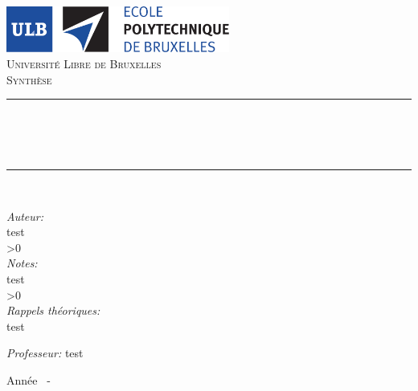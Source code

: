 \AddToShipoutPicture*{\BackgroundPic}

\begin{titlepage}
	\begin{center}	
			
		\newcommand{\HRule}{\rule{\linewidth}{0.5mm}}   			            %
		\includegraphics[width=0.55\textwidth]{../../Builder/titlepage/logo.pdf}~\\[1cm]				%
			
			\textsc{\LARGE Université Libre de Bruxelles}\\[1.5cm]
			\textsc{\Large Synthèse}\\[0.5cm]
			
			\HRule \\[0.4cm]
			{ \huge \bfseries \cours \ \\\memo \\[0.4cm] }
			
			
			\HRule \\[1.5cm]
			\begin{minipage}[t]{0.6\textwidth}
				\begin{flushleft}%
					\emph{Auteur:}\\
					\whileboolexpr
					{ test {\ifnumcomp{\value{iter}}{<}{\theauteurcnt}} }%
					{\getauteur{\theiter}\\}
					\setcounter{iter}{0}%
					\ifnum\thenoteurcnt>0%
					\ \\
					\emph{Notes:}\\
					\whileboolexpr
					{ test {\ifnumcomp{\value{iter}}{<}{\thenoteurcnt}} }%
					{\getnoteur{\theiter}\\}%
					\setcounter{iter}{0}%
					\fi%
					\ifnum\therappeltheocnt>0%
					\ \\
					\emph{Rappels théoriques:}\\
					\whileboolexpr
					{ test {\ifnumcomp{\value{iter}}{<}{\therappeltheocnt}} }%
					{\getrappeltheo{\theiter}\\}%
					\setcounter{iter}{0}%
					\fi%
				\end{flushleft}
			\end{minipage}%
			\begin{minipage}[t]{0.25\textwidth}
				\emph{Professeur:}
				\whileboolexpr
				{ test {\ifnumcomp{\value{iter}}{<}{\theprofesseurcnt}} }%
				{\\ \getprofesseur{\theiter}}%
				\setcounter{iter}{0}%
			\end{minipage}
			
			\vfill
			
			{\large Année \adebut~-~\afin}
			
		\end{center}
	\end{titlepage}
